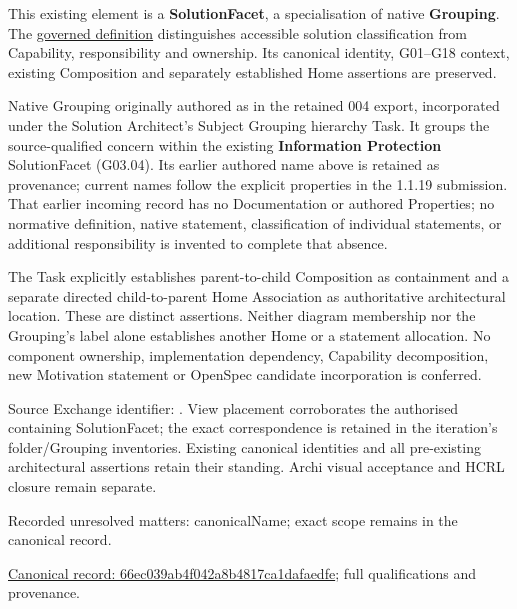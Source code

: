 This existing element is a \textbf{SolutionFacet}, a specialisation of native
\textbf{Grouping}. The \href{\detokenize{../../../../../../../governance/continuum-representation.md#solutionfacet-classification--1119-candidate}}{governed definition}
distinguishes accessible solution classification from Capability, responsibility
and ownership. Its canonical identity, G01–G18 context, existing Composition
and separately established Home assertions are preserved.



Native Grouping originally authored as \texttt{} in the retained 004 export,
incorporated under the Solution Architect's Subject Grouping hierarchy Task.
It groups the source-qualified \texttt{} concern within
the existing \textbf{Information Protection} SolutionFacet (G03.04). Its earlier authored name above is retained as provenance; current names
follow the explicit properties in the 1.1.19 submission.
That earlier incoming record has no Documentation or authored Properties; no normative
definition, native statement, classification of individual statements, or
additional responsibility is invented to complete that absence.



The Task explicitly establishes parent-to-child Composition as containment and
a separate directed child-to-parent Home Association as authoritative architectural
location. These are distinct assertions. Neither diagram membership nor the
Grouping's label alone establishes another Home or a statement allocation.
No component ownership, implementation dependency, Capability decomposition,
new Motivation statement or OpenSpec candidate incorporation is conferred.



Source Exchange identifier: \texttt{}. View placement corroborates
the authorised containing SolutionFacet; the exact correspondence is retained in the
iteration's folder/Grouping inventories. Existing canonical identities and all
pre-existing architectural assertions retain their standing. Archi visual
acceptance and HCRL closure remain separate.


{\small Recorded unresolved matters: canonicalName; exact scope remains in the canonical record.}\par
{\footnotesize \href{../../../../../../../continuum/grouping/66ec039ab4f042a8b4817ca1dafaedfe.md}{Canonical record: 66ec039ab4f042a8b4817ca1dafaedfe}; full qualifications and provenance.}\par
